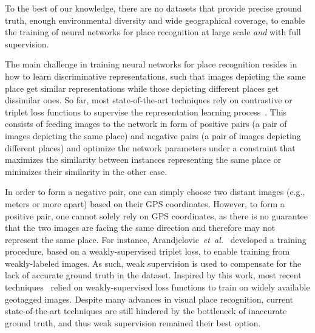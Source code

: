 \documentclass{article}
\newcommand{\etal}{\textit{et~al.}}
\begin{document}
To the best of our knowledge, there are no datasets that provide precise ground truth, enough environmental diversity and wide geographical coverage, to enable the training of neural networks for place recognition at large scale \emph{and} with full supervision.

The main challenge in training neural networks for place recognition resides in how to learn discriminative representations, such that images depicting the same place get similar representations while those depicting different places get dissimilar ones. So far, most state-of-the-art techniques rely on contrastive or triplet  loss functions to supervise the representation learning process~\cite{zhang2021visual}. This consists of feeding images to the network in form of positive pairs (a pair of images depicting the same place) and negative pairs (a pair of images depicting different places) and optimize the network parameters under a constraint that maximizes the similarity between instances representing the same place or minimizes their similarity in the other case. 

In order to form a negative pair, one can simply choose two distant images (e.g.,  meters or more apart) based on their GPS coordinates. However, to form a positive pair, one cannot solely rely on GPS coordinates, as there is no guarantee that the two images are facing the same direction and therefore may not represent the same place.
For instance, Arandjelovic~\etal~\cite{arandjelovic2016netvlad} developed a training procedure, based on a weakly-supervised triplet loss, to enable training from weakly-labeled images. As such, weak supervision is used to compensate for the lack of accurate ground truth in the dataset. Inspired by this work, most recent techniques~\cite{arandjelovic2016netvlad, kim2017learned, liu2019stochastic, ge2020self} relied on weakly-supervised loss functions to train on widely available geotagged images. Despite many advances in visual place recognition, current state-of-the-art techniques are still hindered by the bottleneck of inaccurate ground truth, and thus weak supervision remained their best option.
\end{document}
